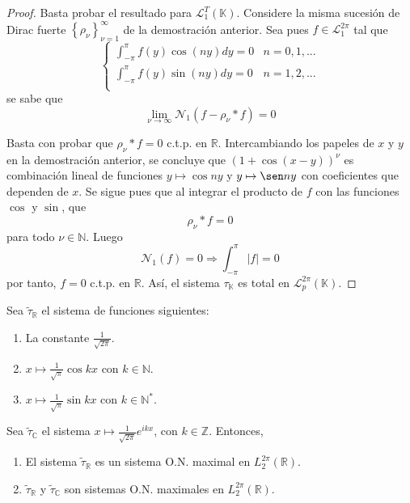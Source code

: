 \documentclass[12pt]{report}
\theoremstyle{largebreak}
\newcommand\abs[1]{\ensuremath{\big|#1\big|}}
\newcommand{\N}[2]{\ensuremath{\mathcal{N}_{#1}\left(#2\right)}}
\begin{document}
    \begin{proof}
        Basta probar el resultado para $\mathcal{L}_1^T(\mathbb{K})$. Considere la misma sucesión de Dirac fuerte $\left\{\rho_\nu \right\}_{\nu=1}^\infty$ de la demostración anterior. Sea pues $f\in\mathcal{L}_1^{2\pi}$ tal que
        \begin{equation*}
            \left\{
                \begin{array}{cr}
                    \int_{-\pi}^{\pi}f(y)\cos(ny)dy=0 & n=0,1,...\\
                    \int_{-\pi}^{\pi}f(y)\sin(ny)dy=0 & n=1,2,...\\
                \end{array}
            \right.
        \end{equation*}
        se sabe que
        \begin{equation*}
            \lim_{\nu\rightarrow\infty}\N{1}{f-\rho_\nu*f}=0
        \end{equation*}
    
        Basta con probar que $\rho_\nu*f=0$ c.t.p. en $\mathbb{R}$. Intercambiando los papeles de $x$ y $y$ en la demostración anterior, se concluye que $(1+\cos(x-y))^\nu$ es combinación lineal de funciones $y\mapsto\cos ny$ y $y\mapsto\sen ny$ con coeficientes que dependen de $x$. Se sigue pues que al integrar el producto de $f$ con las funciones $\cos$ y $\sin$, que
        \begin{equation*}
            \rho_\nu*f=0
        \end{equation*}
        para todo $\nu\in\mathbb{N}$. Luego
        \begin{equation*}
            \N{1}{f}=0\Rightarrow \int_{-\pi}^{\pi} \abs{f}=0
        \end{equation*}
        por tanto, $f=0$ c.t.p. en $\mathbb{R}$. Así, el sistema $\tau_{\mathbb{K}}$ es total en $\mathcal{L}_p^{2\pi}(\mathbb{K})$.
    \end{proof}

    \begin{theor}
        Sea $\tilde{\tau}_{\mathbb{R}}$ el sistema de funciones siguientes:
        \begin{enumerate}
            \item La constante $\frac{1}{\sqrt{2\pi}}$.
            \item $x\mapsto\frac{1}{\sqrt{\pi}}\cos kx$ con $k\in\mathbb{N}$.
            \item $x\mapsto\frac{1}{\sqrt{\pi}}\sin kx$ con $k\in\mathbb{N}^*$.
        \end{enumerate}
        Sea $\tilde{\tau}_{\mathbb{C}}$ el sistema $x\mapsto\frac{1}{\sqrt{2\pi}}e^{ikx}$, con $k\in\mathbb{Z}$. Entonces,
        \begin{enumerate}
            \item El sistema $\tilde{\tau}_\mathbb{R}$ es un sistema O.N. maximal en $L_2^{ 2\pi}(\mathbb{R})$.
            \item $\tilde{\tau}_{\mathbb{R}}$ y $\tilde{\tau}_{\mathbb{C}}$ son sistemas O.N. maximales en $L_2^{2\pi}(\mathbb{R})$.
        \end{enumerate}
    \end{theor}
\end{document}
